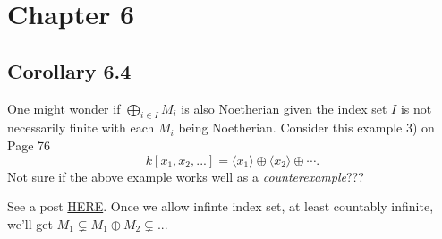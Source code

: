 \section{Chapter 6}

\subsection{Corollary 6.4}

One might wonder if $\bigoplus_{i\in I}M_i$ is also Noetherian given the index set $I$ is not necessarily finite with each $M_i$ being Noetherian. 
Consider this example 3) on Page 76
$$k[x_1,x_2,...]=\langle x_1\rangle \oplus\langle x_2\rangle\oplus\cdots.$$
Not sure if the above example works well as a \textit{counterexample}???

See a post \href{https://math.stackexchange.com/questions/173614/question-about-direct-sum-of-noetherian-modules-is-noetherian}{HERE}. 
Once we allow infinte index set, at least countably infinite, we'll get $M_1\subsetneq M_1\oplus M_2\subsetneq...$